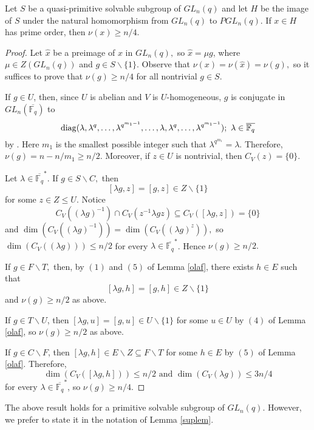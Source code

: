  
\begin{Lem}\label{nuuni}
Let $S$ be a quasi-primitive solvable subgroup of $GL_n(q)$ and let $H$  be the image of $S$ under the natural homomorphism from $GL_n(q)$ to $PGL_n(q).$ If $x \in H$ has prime order, then $\nu(x) \ge n/4.$
\end{Lem}
\begin{proof}
Let $\hat{x}$ be a preimage of $x$ in $GL_n(q),$ so $\hat{x}=\mu g$, where $\mu \in Z(GL_n(q))$ and $g \in S \backslash \{1\}.$ Observe that $\nu(x)=\nu(\hat{x})=\nu(g),$ so it suffices to prove that $\nu(g)\ge n/4$ for all nontrivial $g \in S.$

If $g \in U$, then, since $U$ is abelian and $V$ is $U$-homogeneous, $g$ is conjugate in $GL_n(\overline{\mathbb{F}_q})$ to 
$$\mathrm{diag}(\lambda, \lambda^q, \ldots, \lambda^{q^{m_1-1}}, \ldots, \lambda, \lambda^q, \ldots, \lambda^{q^{m_1-1}}); \text{ } \lambda \in \overline{\mathbb{F}_q}$$
by \cite[Lemma 1.3]{buturl}. Here $m_1$ is the smallest possible integer such that  $\lambda^{q^{m_1}}=\lambda.$ Therefore, $\nu(g)=n-n/m_1\ge n/2.$ Moreover, if $z \in U$ is nontrivial, then $C_V(z)=\{0\}.$

Let $\lambda \in \overline{\mathbb{F}_q}^*.$ If $g \in S \backslash C,$ then 
$$[\lambda g, z]=[g,z] \in Z \backslash \{1\}$$ for some $z \in Z \le U.$ Notice 
$$C_V((\lambda g)^{-1}) \cap C_V(z^{-1} \lambda g z) \subseteq C_V([\lambda g, z])=\{0\}$$
and $\dim(C_V((\lambda g)^{-1}))= \dim(C_V((\lambda g)^{z})),$ so $ \dim (C_V((\lambda g))) \le n/2$ for every $\lambda \in \overline{\mathbb{F}_q}^*$. Hence $\nu(g)\ge n/2.$

If $g \in F \backslash T,$ then, by $(1)$ and $(5)$ of Lemma \ref{olaf}, there exists $h \in E$ such that $$[ \lambda g, h]= [g,h] \in Z \backslash \{1\}$$ and $\nu(g) \ge n/2$ as above.

If $g \in T \backslash U$, then $[\lambda g, u]= [g,u] \in U \backslash \{1\}$ for some $u \in U$ by $(4)$ of Lemma \ref{olaf}, so $\nu(g) \ge n/2$ as above.

If $g \in C \backslash F$, then $[\lambda g, h] \in E \backslash Z \subseteq F \backslash T$ for some $h \in E$ by $(5)$ of Lemma \ref{olaf}. Therefore, 
$$\dim (C_V([\lambda g, h])) \le n/2 \text{ and } \dim (C_V(\lambda g)) \le 3n/4$$
for every $\lambda \in \overline{\mathbb{F}_q}^*$,
so $\nu(g) \ge n/4.$
\end{proof}

The above result  holds for a primitive solvable  subgroup of $GL_n(q).$ However, we prefer to state it in the notation of Lemma \ref{suplem}.%


